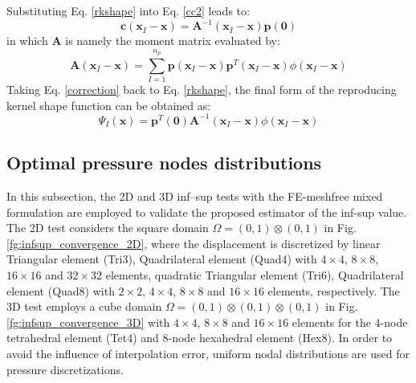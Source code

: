 Substituting Eq. \ref{rkshape} into Eq. \eqref{cc2} leads to:
\begin{equation}\label{correction}
\boldsymbol{c}(\boldsymbol{x}_I-\boldsymbol{x}) = \boldsymbol{A}^{-1}(\boldsymbol{x}_I-\boldsymbol{x}) \boldsymbol{p}(\boldsymbol{0})
\end{equation}
in which $\boldsymbol{A}$ is namely the moment matrix evaluated by:
\begin{equation}
\boldsymbol{A}(\boldsymbol{x}_I-\boldsymbol{x}) = \sum_{I=1}^{n_p} \boldsymbol{p}(\boldsymbol{x}_I-\boldsymbol{x}) \boldsymbol{p}^T(\boldsymbol{x}_I-\boldsymbol{x}) \phi(\boldsymbol{x}_I-\boldsymbol{x})
\end{equation}
Taking Eq. \eqref{correction} back to Eq. \eqref{rkshape}, the final form of the reproducing kernel shape function can be obtained as:
\begin{equation}
\Psi_I(\boldsymbol{x}) = \boldsymbol{p}^T(\boldsymbol{0}) \boldsymbol{A}^{-1}(\boldsymbol{x}_I-\boldsymbol{x}) \phi(\boldsymbol{x}_I-\boldsymbol{x})
\end{equation}

\subsection{Optimal pressure nodes distributions}

In this subsection, the 2D and 3D inf--sup tests \cite{chapelle1993} with the FE-meshfree mixed formulation are employed to validate the proposed estimator of the inf-sup value. The 2D test considers the square domain $\Omega = (0,1)\otimes (0,1)$ in Fig. \ref{fg:infsup_convergence_2D}, where the displacement is discretized by linear Triangular element (Tri3), Quadrilateral element (Quad4) with $4\times 4$, $8\times 8$, $16\times 16$ and $32\times 32$ elements, quadratic Triangular element (Tri6), Quadrilateral element (Quad8) with $2\times 2$, $4\times 4$, $8\times 8$ and $16\times 16$ elements, respectively. The 3D test employs a cube domain $\Omega = (0,1)\otimes (0,1)\otimes (0,1)$ in Fig. \ref{fg:infsup_convergence_3D} with $4\times 4$, $8\times 8$ and $16\times 16$ elements for the 4-node tetrahedral element (Tet4) and 8-node hexahedral element (Hex8). In order to avoid the influence of interpolation error, uniform nodal distributions are used for pressure discretizations.


